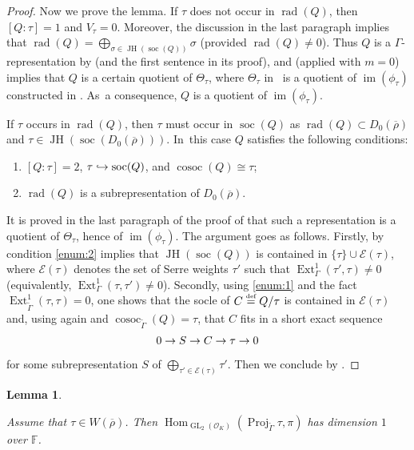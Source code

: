 \documentclass[JEP,XML,SOM,Unicode,NoFloatCountersInSection, NoEqCountersInSection,published]{cedram}
\newcommand\hto{\mathrel{\lhook\joinrel\to}}
\let\wt\widetilde
\renewcommand{\theenumi}{\roman{enumi}}
\newcommand{\defeq}{\stackrel{\textrm{\tiny{\upshape{def}}}}{=}}
\newcommand{\F}{\mathbb{F}}
\newcommand{\cO}{\mathcal{O}}
\newcommand{\brho}{\overline{\rho}}
\DeclareMathOperator{\cosoc}{cosoc}
\DeclareMathOperator{\Ext}{Ext}
\DeclareMathOperator{\GL}{GL}
\DeclareMathOperator{\Hom}{Hom}
\DeclareMathOperator{\im}{im}
\DeclareMathOperator{\JH}{\mathrm{JH}}
\DeclareMathOperator{\Proj}{Proj}
\DeclareMathOperator{\rad}{rad}
\DeclareMathOperator{\soc}{soc}
\theoremstyle{plain}
\newtheorem{lem}[prop]{Lemma}
\theoremstyle{definition}
\begin{document}
\begin{proof}
Now we prove the lemma. If $\tau$ does not occur in $\rad(Q)$, then $[Q:\tau]=1$ and $V_{\tau}=0$. Moreover, the discussion in the last paragraph implies that $\rad(Q)=\bigoplus_{\sigma\in \JH(\soc(Q))}\sigma$ (provided $\rad(Q)\neq 0$). Thus $Q$ is a $\Gamma$-representation by \cite[Lem.\,4.3.4]{BHHMS4} (and the first sentence in its proof), and \cite[Cor.\,3.14]{HuWang2} (applied with $m=0$) implies that $Q$ is a certain quotient of $\Theta_{\tau}$, where $\Theta_{\tau}$ in \loccit\ is a quotient of $\im(\phi_{\tau})$ constructed in \cite[Prop.\,3.12]{HuWang2}. As~a consequence, $Q$ is a quotient of $\im(\phi_{\tau})$.

If $\tau$ occurs in $\rad(Q)$, then $\tau$ must occur in $\soc(Q)$ as $\rad(Q)\subset D_0(\brho)$ and $\tau \in \JH(\soc(D_0(\brho)))$. In~this case $Q$ satisfies the following conditions:
\begin{enumerate}\renewcommand{\theenumi}{\arabic{enumi}}
\item\label{enum:1} $[Q:\tau]=2$, $\tau\hto \soc(Q)$, and $\cosoc(Q)\cong\tau$;
\item\label{enum:2} $\rad(Q)$ is a subrepresentation of $D_0(\brho)$.
\end{enumerate}
It is proved in the last paragraph of the proof of \cite[Prop.\,4.18]{HuWang2} that such a representation is a quotient of $\Theta_{\tau}$, hence of $\im(\phi_{\tau})$. The argument goes as follows. Firstly, by \cite[Lem.\,4.10]{HuWang2} condition \eqref{enum:2} implies that $\JH(\soc(Q))$ is contained in $\{\tau\}\cup \mathscr{E}(\tau)$, where $\mathscr{E}(\tau)$ denotes the set of Serre weights $\tau'$ such that $\Ext^1_{\Gamma}(\tau',\tau)\neq0$ (equivalently, $\Ext^1_{\Gamma}(\tau,\tau')\neq0$). Secondly, using \eqref{enum:1} and the fact $\Ext^1_{\widetilde{\Gamma}}(\tau,\tau)=0$, one shows that the socle of $C\defeq Q/\tau$ is contained in $\mathscr{E}(\tau)$ and, using again \cite[Lem.\,4.10]{HuWang2} and $\cosoc_{\widetilde{\Gamma}}(Q)=\tau$, that $C$ fits in a short exact sequence\vspace*{-3pt}
\[
0\to S\to C\rightarrow\tau\to 0
\]
for some subrepresentation $S$ of $\bigoplus_{
\tau'\in\mathscr{E}(\tau)}\tau'$. Then we conclude by \cite[Cor.\,3.14]{HuWang2}.
\end{proof}

\begin{lem}\label{lem:HW4.20}

Assume that $\tau\in W(\brho)$. Then $ \Hom_{\GL_2(\cO_K)}(\Proj_{\wt{\Gamma}}\tau,\pi)$ has dimension $1$ over $\F$.
\end{lem}
\end{document}
